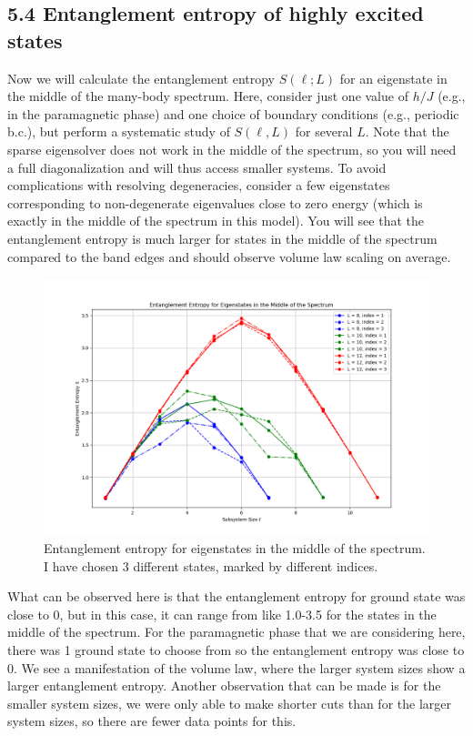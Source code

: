 \documentclass[12pt]{article}
\begin{document}
\subsection*{5.4 Entanglement entropy of highly excited states}
Now we will calculate the entanglement entropy $S(\ell; L)$ for an eigenstate in the middle of the many-body spectrum. Here, consider just one value of $h/J$ (e.g., in the paramagnetic phase) and one choice of boundary conditions (e.g., periodic b.c.), but perform a systematic study of $S(\ell, L)$ for several $L$. Note that the sparse eigensolver does not work in the middle of the spectrum, so you will need a full diagonalization and will thus access smaller systems. To avoid complications with resolving degeneracies, consider a few eigenstates corresponding to non-degenerate eigenvalues close to zero energy (which is exactly in the middle of the spectrum in this model). You will see that the entanglement entropy is much larger for states in the middle of the spectrum compared to the band edges and should observe volume law scaling on average.\\
\begin{figure}[h]
\centering
\includegraphics[width=\textwidth]{entanglement_entropy_middle_spectrum.png}
\caption{Entanglement entropy for eigenstates in the middle of the spectrum. I have chosen 3 different states, marked by different indices.}
\end{figure}
What can be observed here is that the entanglement entropy for ground state was close to 0, but in this case, it can range from like 1.0-3.5 for the states in the middle of the spectrum. For the paramagnetic phase that we are considering here, there was 1 ground state to choose from so the entanglement entropy was close to 0. We see a manifestation of the volume law, where the larger system sizes show a larger entanglement entropy. Another observation that can be made is for the smaller system sizes, we were only able to make shorter cuts than for the larger system sizes, so there are fewer data points for this.
\end{document}
